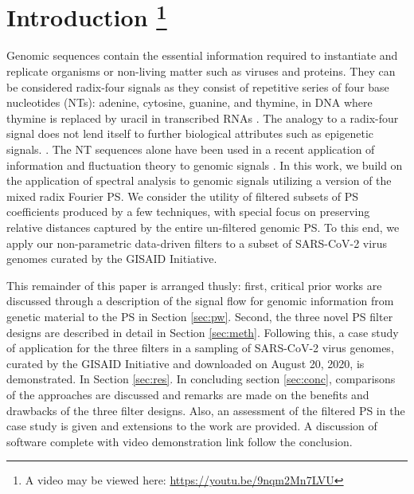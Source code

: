 \documentclass[10pt,conference]{IEEEtran}
\begin{document}
\IEEEdisplaynontitleabstractindextext

\IEEEpeerreviewmaketitle

\vspace{-0.5 em}
\section{Introduction \footnote{A video may be viewed here: \href{https://youtu.be/9nqm2Mn7LVU}{https://youtu.be/9nqm2Mn7LVU}}}
\label{sec:int}

\noindent Genomic sequences  contain the essential information required to instantiate and replicate organisms or non-living matter such as viruses and proteins.
They can be considered radix-four signals as they consist of repetitive series of four base nucleotides (NTs): 
adenine, cytosine, guanine, and thymine, in DNA where thymine is replaced by uracil in transcribed  RNAs  \cite{Ana01}. 
The analogy to a radix-four signal does not lend itself to further biological 
attributes such as epigenetic signals.  \cite{Shu17} \cite{San19}.
The NT sequences alone have been used in a recent application of  information and fluctuation theory to genomic signals
\cite{Dem14}.  
In this work, we build on the application of spectral analysis to genomic signals utilizing a version of the mixed radix Fourier PS\cite{Sin69}.
We consider the utility of filtered subsets of PS coefficients produced by a few techniques, with special focus on preserving relative distances 
captured by the entire un-filtered genomic PS. 
To this end, we apply our non-parametric data-driven filters to a subset of SARS-CoV-2 virus genomes curated by the GISAID \cite{gisaid} 
Initiative. 

This remainder of this paper is arranged thusly: first, critical prior works are discussed through a description of the signal flow for 
genomic information from genetic material to the PS in Section \ref{sec:pw}.  Second, the three novel PS filter designs are described in detail in Section \ref{sec:meth}. Following this, a case study of application for the three filters in a sampling of SARS-CoV-2 
virus genomes, curated by the GISAID Initiative and downloaded on August 20, 2020, is demonstrated.  In Section \ref{sec:res}. In concluding section \ref{sec:conc}, comparisons of the approaches are discussed and remarks are made on the benefits and drawbacks of the three filter designs. Also, an 
assessment of the filtered PS in the case study is given and extensions to the work are provided.  
A discussion of software complete with video demonstration link follow the conclusion.
\end{document}
